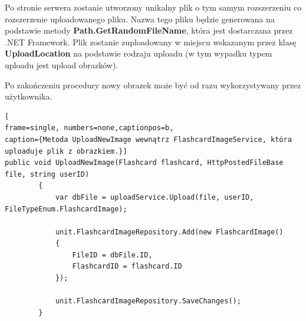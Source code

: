 Po stronie serwera zostanie utworzony unikalny plik o tym samym rozszerzeniu co rozszerzenie uploadowanego pliku. Nazwa tego pliku będzie generowana na podstawie metody \textbf{Path.GetRandomFileName}, która jest dostarczana przez .NET Framework. Plik zostanie zuploadowany w miejscu wskazanym przez klasę \textbf{UploadLocation} na podstawie rodzaju uploadu (w tym wypadku typem uploadu jest upload obrazków).

Po zakończeniu procedury nowy obrazek może być od razu wykorzystywany przez użytkownika.

\begin{minipage}{\linewidth}
\begin{lstlisting}[
frame=single, numbers=none,captionpos=b, 
caption={Metoda UploadNewImage wewnątrz FlashcardImageService, która uploaduje plik z obrazkiem.}]
public void UploadNewImage(Flashcard flashcard, HttpPostedFileBase file, string userID)
        {
            var dbFile = uploadService.Upload(file, userID, FileTypeEnum.FlashcardImage);

            unit.FlashcardImageRepository.Add(new FlashcardImage()
            {
                FileID = dbFile.ID,
                FlashcardID = flashcard.ID
            });
            
            unit.FlashcardImageRepository.SaveChanges();
        }
\end{lstlisting}
\end{minipage}
